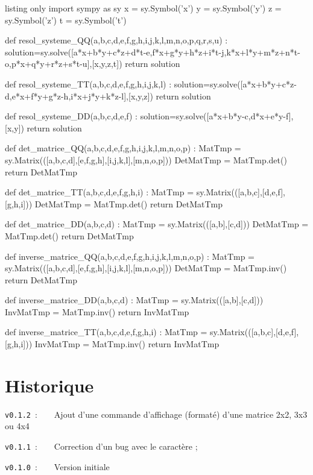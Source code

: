 \documentclass[a4paper,11pt]{article}
\begin{document}
\begin{PresentationCodePython}{listing only}
import sympy as sy
x = sy.Symbol('x')
y = sy.Symbol('y')
z = sy.Symbol('z')
t = sy.Symbol('t')

def resol_systeme_QQ(a,b,c,d,e,f,g,h,i,j,k,l,m,n,o,p,q,r,s,u) :
	solution=sy.solve([a*x+b*y+c*z+d*t-e,f*x+g*y+h*z+i*t-j,k*x+l*y+m*z+n*t-o,p*x+q*y+r*z+s*t-u],[x,y,z,t])
	return solution

def resol_systeme_TT(a,b,c,d,e,f,g,h,i,j,k,l) :
	solution=sy.solve([a*x+b*y+c*z-d,e*x+f*y+g*z-h,i*x+j*y+k*z-l],[x,y,z])
	return solution

def resol_systeme_DD(a,b,c,d,e,f) :
	solution=sy.solve([a*x+b*y-c,d*x+e*y-f],[x,y])
	return solution

def det_matrice_QQ(a,b,c,d,e,f,g,h,i,j,k,l,m,n,o,p) :
	MatTmp = sy.Matrix(([a,b,c,d],[e,f,g,h],[i,j,k,l],[m,n,o,p]))
	DetMatTmp = MatTmp.det()
	return DetMatTmp

def det_matrice_TT(a,b,c,d,e,f,g,h,i) :
	MatTmp = sy.Matrix(([a,b,c],[d,e,f],[g,h,i]))
	DetMatTmp = MatTmp.det()
	return DetMatTmp

def det_matrice_DD(a,b,c,d) :
	MatTmp = sy.Matrix(([a,b],[c,d]))
	DetMatTmp = MatTmp.det()
	return DetMatTmp

def inverse_matrice_QQ(a,b,c,d,e,f,g,h,i,j,k,l,m,n,o,p) :
	MatTmp = sy.Matrix(([a,b,c,d],[e,f,g,h],[i,j,k,l],[m,n,o,p]))
	DetMatTmp = MatTmp.inv()
	return DetMatTmp

def inverse_matrice_DD(a,b,c,d) :
	MatTmp = sy.Matrix(([a,b],[c,d]))
	InvMatTmp = MatTmp.inv()
	return InvMatTmp

def inverse_matrice_TT(a,b,c,d,e,f,g,h,i) :
	MatTmp = sy.Matrix(([a,b,c],[d,e,f],[g,h,i]))
	InvMatTmp = MatTmp.inv()
	return InvMatTmp
\end{PresentationCodePython}

\pagebreak

\part{Historique}

\verb|v0.1.2|~:~~~~Ajout d'une commande d'affichage (formaté) d'une matrice 2x2, 3x3 ou 4x4

\verb|v0.1.1|~:~~~~Correction d'un bug avec le caractère \og ; \fg{}

\verb|v0.1.0|~:~~~~Version initiale
\end{document}
